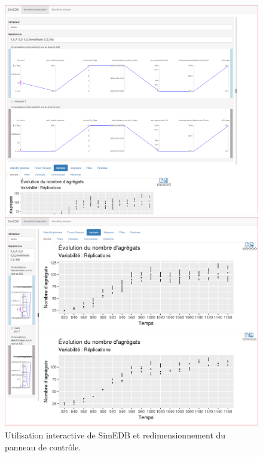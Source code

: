 \begin{figure}[H]
\begin{minipage}[t]{.49\linewidth}
\end{minipage} \hfill
\begin{minipage}[b]{.49\linewidth}
\centering
\vspace{0pt}
\includegraphics[width=\linewidth]{img/SimEDB_selection.png}
\end{minipage} \hfill
\begin{minipage}[b]{.49\linewidth}
\centering
\vspace{0pt}
\includegraphics[width=\linewidth]{img/SimEDB_indicateur_grand_magnified.png}
\end{minipage}
\caption{Utilisation interactive de SimEDB et redimensionnement du panneau de contrôle.}
\label{fig:resizing}
\end{figure}

